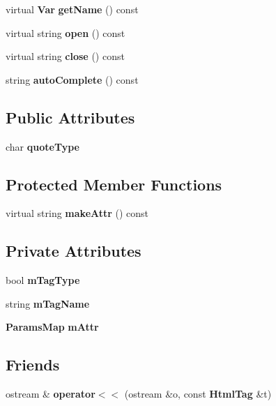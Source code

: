 \begin{CompactItemize}
\item 
virtual {\bf Var} \textbf{getName} () const \label{classHtmlTag_c1d2797c8240cfed348d942bb5928a28}

\item 
virtual string \textbf{open} () const \label{classHtmlTag_c259f32d68385a8fe05b45211ac22a9e}

\item 
virtual string \textbf{close} () const \label{classHtmlTag_39c5f9b8f582fb4e3e502c3556ef63e5}

\item 
string \textbf{autoComplete} () const \label{classHtmlTag_de0a8b993d7dae6ed9b394c2307cf817}

\end{CompactItemize}
\subsection*{Public Attributes}
\begin{CompactItemize}
\item 
char \textbf{quoteType}\label{classHtmlTag_997be48566824cbb7dfe293c684406e6}

\end{CompactItemize}
\subsection*{Protected Member Functions}
\begin{CompactItemize}
\item 
virtual string \textbf{makeAttr} () const \label{classHtmlTag_0e2c807c620d5036e1075271a0b8c440}

\end{CompactItemize}
\subsection*{Private Attributes}
\begin{CompactItemize}
\item 
bool \textbf{mTagType}\label{classHtmlTag_0f613e3d7d43595fa69175ac9a966b13}

\item 
string \textbf{mTagName}\label{classHtmlTag_9d633cde7073067759c261135fb592da}

\item 
{\bf ParamsMap} \textbf{mAttr}\label{classHtmlTag_895fa5e2b887e674df0710259dd83b56}

\end{CompactItemize}
\subsection*{Friends}
\begin{CompactItemize}
\item 
ostream \& \textbf{operator$<$$<$} (ostream \&o, const {\bf HtmlTag} \&t)\label{classHtmlTag_378170d98d050945592ea3afc7adb9f0}

\end{CompactItemize}


